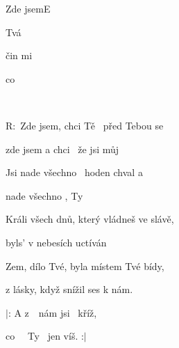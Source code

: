 \pagebreak
\setcounter{page}{121}
\begin{song}{Zde jsem}{E}{}

\begin{SBVerse}

 Tvá  

čin mi 

 co   

  

\end{SBVerse}

\begin{SBChorus}

R: Zde jsem, chci Tě  před Tebou se 

zde jsem a chci  že jsi můj 

Jsi nade všechno  hoden chval a 

nade všechno , Ty 

\end{SBChorus}

\begin{SBVerse}

Králi všech dnů, který vládneš ve slávě, 

byls' v nebesích uctíván

Zem, dílo Tvé, byla místem Tvé bídy, 

z lásky, když snížil ses k nám.

\end{SBVerse}

\begin{SBChorus*}

$|$: A z  nám jsi  kříž,

co   Ty  jen víš. :$|$

\end{SBChorus*}

\end{song}
\pagebreak
